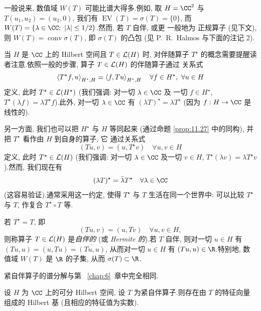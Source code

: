 一般说来, 数值域 $W(T)$ 可能比谱大得多.例如, 取 $H=\CC^2$ 与
$T(u_1,u_2)=(u_2,0)$, 我们有
$\operatorname{EV}(T)=\sigma(T)=\{0\}$, 而
$W(T)=\{\lambda\in\CC;\ \abs{\lambda}\le1/2\}$.然而, 若 $T$ 自伴, 或更
一般地为
正规算子 (见下文), 则 $W(T)=\operatorname{conv}\sigma(T)$, 即
$\sigma(T)$ 的凸包 (见 P.~R.~Halmos  与下面的注记 2).

当 $H$ 是 $\CC$ 上的 Hilbert 空间且 $T\in\mathcal{L}(H)$ 时, 对伴随算子 $T^\star$
的概念需要提醒读者注意.依照一般的步骤, 算子 $T\in\mathcal{L}(H)$ 的伴随算子通过
关系式
\begin{equation*}
\left\langle T^\star f,u\right\rangle_{H^\star,H}=\left\langle f,Tu\right\rangle_{H^\star,H}
\quad\forall f\in H^\star,\ \forall u\in H
\end{equation*}
定义, 此时 $T^\star\in\mathcal{L}(H^\star)$ (我们强调: 对一切 $\lambda\in\CC$ 及
一切 $f\in H^\star$, $T^\star(\lambda f)=\lambda T^\star f$).此外,
对一切 $\lambda\in\CC$ 有 $(\lambda T)^\star=\lambda T^\star$ (因为
$f:H\to\CC$ 是线性的).

另一方面, 我们也可以把 $H^\star$ 与 $H$ 等同起来 (通过命题
 \ref{prop:11.27} 中的同构), 并把 $T^\star$ 看作由 $H$ 到自身的算子, 它
通过关系式
\begin{equation*}
(Tu,v)=(u,T^\star v)\quad\forall u,v\in H
\end{equation*}
定义, 此时 $T^\star\in\mathcal{L}(H)$ (我们强调: 对一切 $\lambda\in\CC$ 及一切
$v\in H$, $T^\star(\lambda v)=\lambda T^\star v$).然而, 我们现在有
\begin{equation}
(\lambda T)^\star=\bar\lambda T^\star\quad\forall\lambda\in\CC
\label{eq:11.24}
\end{equation}
(这容易验证).通常采用这一约定, 使得 $T^\star$ 与 $T$ 生活在同一个世界中:
可以比较 $T^\star$ 与 $T$, 作复合 $T^\star\circ T$ 等.

若 $T^\star=T$, 即
\begin{equation*}
(Tu,v)=(u,Tv)\quad\forall u,v\in H,
\end{equation*}
则称算子 $T\in\mathcal{L}(H)$ 是\emph{自伴的} (或 \emph{Hermite 的}).若 $T$
自伴, 则对一切 $u\in H$ 有 $(Tu,u)=(u,Tu)=\overline{(Tu,u)}$, 从而对一切
$u\in H$ 有 $(Tu,u)\in\R$.特别地, 数值域 $W(T)$ 是 $\R$ 的子集, 从而
$\sigma(T)\subset\R$.

紧自伴算子的谱分解与第~
\ref{chap:6}~章中完全相同.

\begin{proposition}
\label{prop:11.34}
设 $H$ 为 $\CC$ 上的可分 Hilbert 空间, 设 $T$ 为紧自伴算子.则存在由 $T$
的特征向量组成的 Hilbert 基 (且相应的特征值为实数).
\end{proposition}


